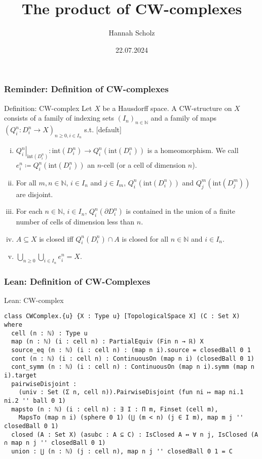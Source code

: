 \documentclass{beamer}
\title{The product of CW-complexes}
\author{Hannah Scholz}
\institute[MI]{Mathematical Institute of the University of Bonn}
\date{22.07.2024}
\newcommand{\N}{\mathbb{N}}
\newcommand{\interior}[1]{\text{int}(#1)}
\newcommand{\restrict}[2]{\ensuremath{\left.#1\right|_{#2}}}
\newcommand{\boundary}{\partial}
\begin{document}
\frame{\titlepage}

\begin{frame}
\frametitle{Reminder: Definition of CW-complexes}
\begin{block}{Definition: CW-complex}
    Let $X$ be a Hausdorff space. 
    A \alert{CW-structure} on $X$ consists of a family of indexing sets $(I_n)_{n \in \N}$ and a family of maps $(Q_i^n\colon D_i^n\rightarrow X)_{n \ge 0, i \in I_n}$ s.t.
    [default]
    \begin{enumerate}[(i)]
        \item $\restrict{Q_i^n}{\interior{D_i^n}}\colon \interior{D_i^n} \rightarrow Q_i^n(\interior{D_i^n})$ is a homeomorphism. We call $e_i^n \coloneq Q_i^n(\interior{D_i^n})$ an \alert{$n$-cell} (or a cell of dimension $n$).
        \item For all $m, n \in \N$, $i \in I_n$ and $j \in I_m$, $Q_i^n(\interior{D_i^n})$ and $Q_j^m(\interior{D_j^m})$ are disjoint.
        \item For each $n \in \N$, $i \in I_n$, $Q_i^n(\boundary D_i^n)$ is contained in the union of a finite number of cells of dimension less than $n$.
        \item $A \subseteq X$ is closed iff $Q_i^n(D_i^n) \cap A$ is closed for all $n \in \N$ and $i \in I_n$.
        \item $\bigcup_{n \ge 0}\bigcup_{i \in I_n}e_i^n = X$.
    \end{enumerate}
\end{block}
\end{frame}

\begin{frame}[fragile]
\frametitle{Lean: Definition of CW-Complexes}
    \begin{exampleblock}{Lean: CW-complex}
    \begin{lstlisting}[basicstyle=\ttfamily\footnotesize]
class CWComplex.{u} {X : Type u} [TopologicalSpace X] (C : Set X) where
  cell (n : ℕ) : Type u
  map (n : ℕ) (i : cell n) : PartialEquiv (Fin n → ℝ) X
  source_eq (n : ℕ) (i : cell n) : (map n i).source = closedBall 0 1
  cont (n : ℕ) (i : cell n) : ContinuousOn (map n i) (closedBall 0 1)
  cont_symm (n : ℕ) (i : cell n) : ContinuousOn (map n i).symm (map n i).target
  pairwiseDisjoint :
    (univ : Set (Σ n, cell n)).PairwiseDisjoint (fun ni ↦ map ni.1 ni.2 '' ball 0 1)
  mapsto (n : ℕ) (i : cell n) : ∃ I : Π m, Finset (cell m),
    MapsTo (map n i) (sphere 0 1) (⋃ (m < n) (j ∈ I m), map m j '' closedBall 0 1)
  closed (A : Set X) (asubc : A ⊆ C) : IsClosed A ↔ ∀ n j, IsClosed (A ∩ map n j '' closedBall 0 1)
  union : ⋃ (n : ℕ) (j : cell n), map n j '' closedBall 0 1 = C
    \end{lstlisting}
    \end{exampleblock}
\end{frame}
\end{document}
